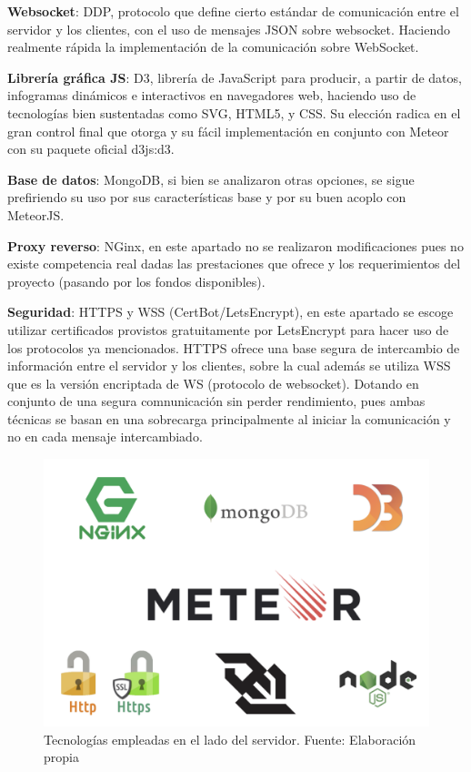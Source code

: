\textbf{Websocket}: DDP\cite{ddp}, protocolo que define cierto estándar de comunicación entre el servidor y los clientes, con el uso de mensajes JSON sobre websocket. Haciendo realmente rápida la implementación de la comunicación sobre WebSocket.

\textbf{Librería gráfica JS}: D3, librería de JavaScript para producir, a partir de datos, infogramas dinámicos e interactivos en navegadores web, haciendo uso de tecnologías bien sustentadas como SVG, HTML5, y CSS. Su elección radica en el gran control final que otorga y su fácil implementación en conjunto con Meteor con su paquete oficial d3js:d3.

\textbf{Base de datos}: MongoDB\cite{mongodb}, si bien se analizaron otras opciones, se sigue prefiriendo su uso por sus características base y por su buen acoplo con MeteorJS.

\textbf{Proxy reverso}: NGinx\cite{nginx}, en este apartado no se realizaron modificaciones pues no existe competencia real dadas las prestaciones que ofrece y los requerimientos del proyecto (pasando por los fondos disponibles). \newline

\textbf{Seguridad}: HTTPS y WSS (CertBot/LetsEncrypt)\cite{certbot}\cite{nginx_certbot}, en este apartado se escoge utilizar certificados provistos gratuitamente por LetsEncrypt para hacer uso de los protocolos ya mencionados. HTTPS ofrece una base segura de intercambio de información entre el servidor y los clientes, sobre la cual además se utiliza WSS que es la versión encriptada de WS (protocolo de websocket). Dotando en conjunto de una segura comnunicación sin perder rendimiento, pues ambas técnicas se basan en una sobrecarga principalmente al iniciar la comunicación y no en cada mensaje intercambiado.

\begin{figure}[H]
	\centering
	\includegraphics[scale=0.6]{figuras/protof/tecnologias.png}
	\caption{Tecnologías empleadas en el lado del servidor. Fuente: Elaboración propia}
	\label{tecnologias}
\end{figure}


